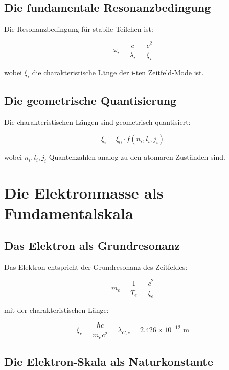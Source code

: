 \documentclass[12pt,a4paper]{report}
\begin{document}
	\subsection{Die fundamentale Resonanzbedingung}
	
	Die Resonanzbedingung für stabile Teilchen ist:
	
	\begin{equation}
		\omega_i = \frac{c}{\lambda_i} = \frac{c^2}{\xi_i}
	\end{equation}
	
	wobei $\xi_i$ die charakteristische Länge der i-ten Zeitfeld-Mode ist.
	
	\subsection{Die geometrische Quantisierung}
	
	Die charakteristischen Längen sind geometrisch quantisiert:
	
	\begin{equation}
		\xi_i = \xi_0 \cdot f(n_i, l_i, j_i)
	\end{equation}
	
	wobei $n_i, l_i, j_i$ Quantenzahlen analog zu den atomaren Zuständen sind.
	
	\section{Die Elektronmasse als Fundamentalskala}
	
	\subsection{Das Elektron als Grundresonanz}
	
	Das Elektron entspricht der Grundresonanz des Zeitfeldes:
	
	\begin{equation}
		m_e = \frac{1}{T_e} = \frac{c^2}{\xi_e}
	\end{equation}
	
	mit der charakteristischen Länge:
	
	\begin{equation}
		\xi_e = \frac{\hbar c}{m_e c^2} = \lambda_{C,e} = 2.426 \times 10^{-12} \text{ m}
	\end{equation}
	
	\subsection{Die Elektron-Skala als Naturkonstante}
	
\end{document}
